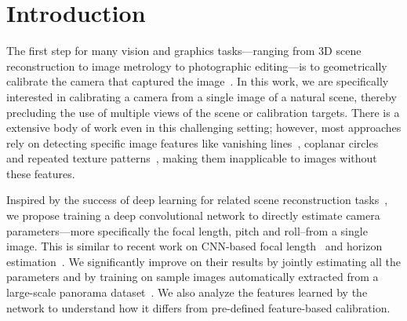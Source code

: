 
\section{Introduction}


The first step for many vision and graphics tasks---ranging from 3D scene reconstruction to image metrology to photographic editing---is to geometrically calibrate the camera that captured the image~\cite{Hartley2004}. In this work, we are specifically interested in calibrating a camera from a single image of a natural scene, thereby precluding the use of multiple views of the scene or calibration targets. There is a extensive body of work even in this challenging setting; however, most approaches rely on detecting specific image features like vanishing lines~\cite{Lee2014}, coplanar circles~\cite{Chen2004} and repeated texture patterns~\cite{Schaffalitzky2000,Criminisi00,Pritts2014}, making them inapplicable to images without these features.

Inspired by the success of deep learning for related scene reconstruction tasks~\cite{choy20163d,bianco2017single}, we propose training a deep convolutional network to directly estimate camera parameters---more specifically the focal length, pitch and roll--from a single image. This is similar to recent work on CNN-based focal length~\cite{Workman2015a} and horizon estimation~\cite{Workman2016}. We significantly improve on their results by jointly estimating all the parameters and by training on sample images automatically extracted from a large-scale panorama dataset~\cite{Xiao2012}. We also analyze the features learned by the network to understand how it differs from pre-defined feature-based calibration.

